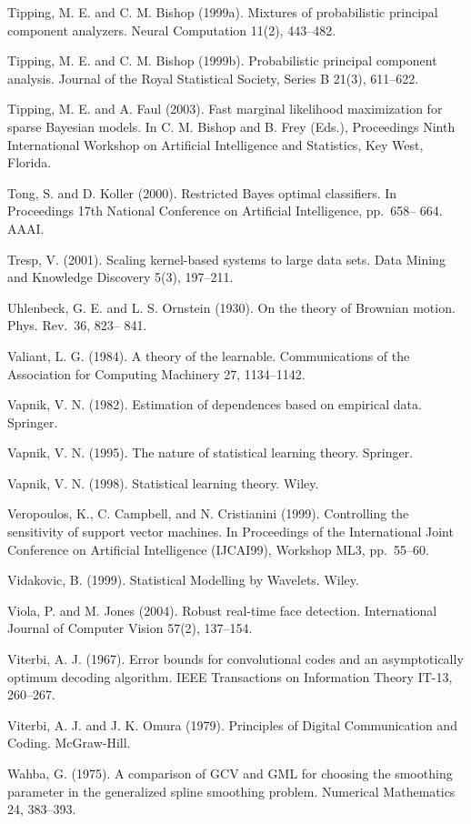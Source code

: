 \documentclass[
  10
]{article}
\begin{document}
Tipping, M. E. and C. M. Bishop (1999a). Mixtures of probabilistic
principal component analyzers. Neural Computation 11(2), 443--482.

Tipping, M. E. and C. M. Bishop (1999b). Probabilistic principal
component analysis. Journal of the Royal Statistical Society, Series B
21(3), 611--622.

Tipping, M. E. and A. Faul (2003). Fast marginal likelihood maximization
for sparse Bayesian models. In C. M. Bishop and B. Frey (Eds.),
Proceedings Ninth International Workshop on Artificial Intelligence and
Statistics, Key West, Florida.

Tong, S. and D. Koller (2000). Restricted Bayes optimal classifiers. In
Proceedings 17th National Conference on Artificial Intelligence,
pp.~658-- 664. AAAI.

Tresp, V. (2001). Scaling kernel-based systems to large data sets. Data
Mining and Knowledge Discovery 5(3), 197--211.

Uhlenbeck, G. E. and L. S. Ornstein (1930). On the theory of Brownian
motion. Phys. Rev.~36, 823-- 841.

Valiant, L. G. (1984). A theory of the learnable. Communications of the
Association for Computing Machinery 27, 1134--1142.

Vapnik, V. N. (1982). Estimation of dependences based on empirical data.
Springer.

Vapnik, V. N. (1995). The nature of statistical learning theory.
Springer.

Vapnik, V. N. (1998). Statistical learning theory. Wiley.

Veropoulos, K., C. Campbell, and N. Cristianini (1999). Controlling the
sensitivity of support vector machines. In Proceedings of the
International Joint Conference on Artificial Intelligence (IJCAI99),
Workshop ML3, pp.~55--60.

Vidakovic, B. (1999). Statistical Modelling by Wavelets. Wiley.

Viola, P. and M. Jones (2004). Robust real-time face detection.
International Journal of Computer Vision 57(2), 137--154.

Viterbi, A. J. (1967). Error bounds for convolutional codes and an
asymptotically optimum decoding algorithm. IEEE Transactions on
Information Theory IT-13, 260--267.

Viterbi, A. J. and J. K. Omura (1979). Principles of Digital
Communication and Coding. McGraw-Hill.

Wahba, G. (1975). A comparison of GCV and GML for choosing the smoothing
parameter in the generalized spline smoothing problem. Numerical
Mathematics 24, 383--393.
\end{document}
